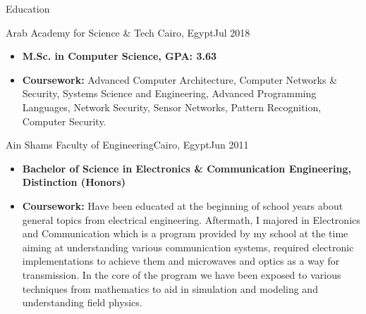 \documentclass[]{mcdowellcv}
\begin{document}
	
	\makeheader
	
	
	\begin{cvsection}{Education}
		\begin{cvsubsection}{Arab Academy for Science \& Tech }{Cairo, Egypt}{Jul 2018 }
			\begin{itemize}
				\item \textbf{M.Sc. in Computer Science, GPA: 3.63}
				\item \textbf{Coursework:} Advanced Computer Architecture, Computer Networks \& Security, Systems Science and Engineering, Advanced Programming Languages, Network Security, Sensor Networks, Pattern Recognition, Computer Security.
			\end{itemize}
		\end{cvsubsection}
		\begin{cvsubsection}{Ain Shams Faculty of Engineering}{Cairo, Egypt}{Jun 2011}
			\begin{itemize}
				\item \textbf{Bachelor of Science in Electronics \& Communication Engineering, Distinction (Honors)}
				\item \textbf{Coursework:} Have been educated at the beginning of school years about general topics from electrical engineering.
				Aftermath, I majored in Electronics and Communication which is a program provided by my school at the time aiming at
				understanding various communication systems, required electronic implementations to achieve them and microwaves and
				optics as a way for transmission. In the core of the program we have been exposed to various techniques from mathematics
				to aid in simulation and modeling and understanding field physics.
			\end{itemize}
		\end{cvsubsection}
	\end{cvsection}
	
\end{document}
